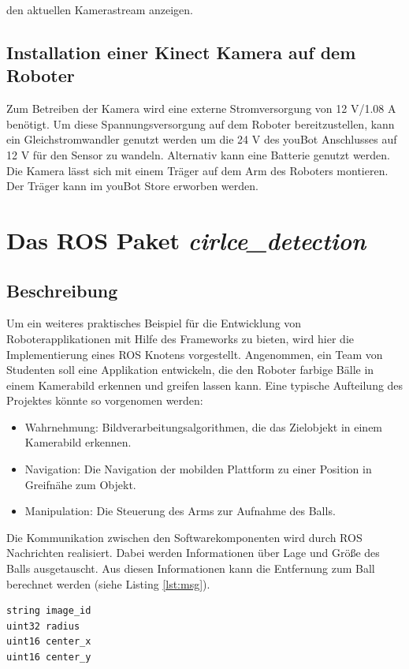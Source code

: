 \documentclass[9pt,a4paper,DIV=11]{scrartcl}
\begin{document}
den aktuellen Kamerastream anzeigen.


\subsection{Installation einer Kinect Kamera auf dem Roboter}

Zum Betreiben der Kamera wird eine externe Stromversorgung von 12 V/1.08 A benötigt. Um diese Spannungsversorgung auf dem Roboter bereitzustellen, kann ein Gleichstromwandler genutzt werden um die 24 V des youBot Anschlusses auf 12 V für den Sensor zu wandeln. Alternativ kann eine Batterie genutzt werden. Die Kamera lässt sich mit einem Träger auf dem Arm des Roboters montieren. Der Träger kann im youBot Store erworben werden.

\section{Das ROS Paket \textit{cirlce\_detection}}
\subsection{Beschreibung}

Um ein weiteres praktisches Beispiel für die Entwicklung von Roboterapplikationen mit Hilfe des Frameworks zu bieten, wird hier die Implementierung eines ROS Knotens vorgestellt. Angenommen, ein Team von Studenten soll eine Applikation entwickeln, die den Roboter farbige Bälle in einem Kamerabild erkennen und greifen lassen kann. Eine typische Aufteilung des Projektes könnte so vorgenomen werden:

\begin{itemize}
\item Wahrnehmung: Bildverarbeitungsalgorithmen, die das Zielobjekt in einem Kamerabild erkennen.
\item Navigation: Die Navigation der mobilden Plattform zu einer Position in Greifnähe zum Objekt.
\item Manipulation: Die Steuerung des Arms zur Aufnahme des Balls.
\end{itemize} 

Die Kommunikation zwischen den Softwarekomponenten wird durch ROS Nachrichten realisiert. Dabei werden Informationen über Lage und Größe des Balls ausgetauscht. Aus diesen Informationen kann die Entfernung zum Ball berechnet werden (siehe Listing \ref{lst:msg}).\\

\begin{lstlisting}[morekeywords={string,uint32,uint16},caption={Nachrichtendefinition circle\_msg},label={lst:msg}]
string image_id
uint32 radius
uint16 center_x
uint16 center_y
\end{lstlisting}
\end{document}
